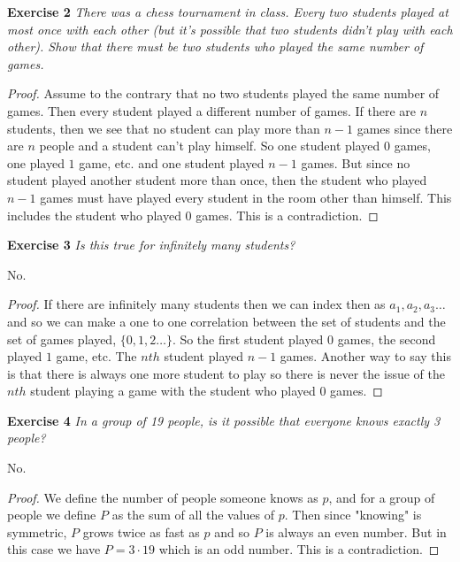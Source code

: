 \documentclass{article}
\begin{document}
\begin{flushleft}
\textbf{Exercise 2}
\textsl{There was a chess tournament in class. Every two students played at most once with each other (but it's possible that two students didn't play with each other). Show that there must be two students who played the same number of games.}
\begin{proof}
Assume to the contrary that no two students played the same number of games. Then every student played a different number of games. If there are $n$ students, then we see that no student can play more than $n-1$ games since there are $n$ people and a student can't play himself. So one student played $0$ games, one played $1$ game, etc. and one student played $n-1$ games. But since no student played another student more than once, then the student who played $n-1$ games must have played every student in the room other than himself. This includes the student who played $0$ games. This is a contradiction.
\end{proof}

\textbf{Exercise 3}
\textsl{Is this true for infinitely many students?}\newline

No.
\begin{proof}
If there are infinitely many students then we can index then as $a_1,a_2,a_3 \dots$ and so we can make a one to one correlation between the set of students and the set of games played, $\{0,1,2 \dots\}$. So the first student played $0$ games, the second played $1$ game, etc. The $nth$ student played $n-1$ games. Another way to say this is that there is always one more student to play so there is never the issue of the $nth$ student playing a game with the student who played $0$ games.
\end{proof}

\textbf{Exercise 4}
\textsl{In a group of 19 people, is it possible that everyone knows exactly 3 people?}\newline

No.
\begin{proof}
We define the number of people someone knows as $p$, and for a group of people we define $P$ as the sum of all the values of $p$. Then since "knowing" is symmetric, $P$ grows twice as fast as $p$ and so $P$ is always an even number. But in this case we have $P=3 \cdot 19$ which is an odd number. This is a contradiction.
\end{proof}


\end{flushleft}
\end{document}
